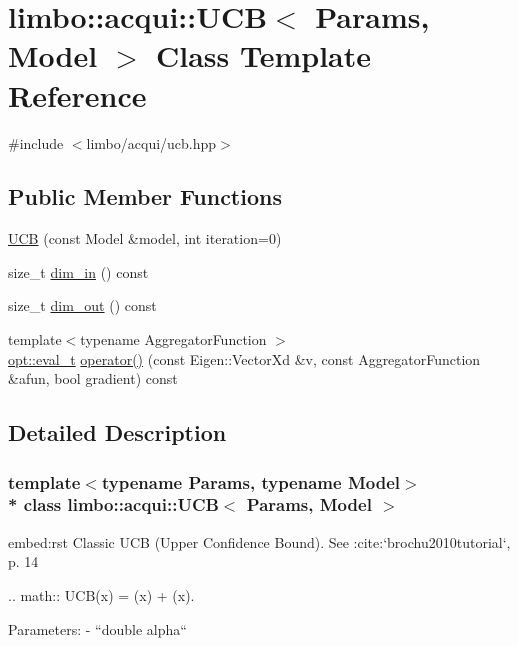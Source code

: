 \hypertarget{classlimbo_1_1acqui_1_1_u_c_b}{}\section{limbo\+:\+:acqui\+:\+:U\+CB$<$ Params, Model $>$ Class Template Reference}
\label{classlimbo_1_1acqui_1_1_u_c_b}


{\ttfamily \#include $<$limbo/acqui/ucb.\+hpp$>$}

\subsection*{Public Member Functions}
\begin{DoxyCompactItemize}
\item 
\hyperlink{classlimbo_1_1acqui_1_1_u_c_b_ae4410ba09273ea88b36130ea916fcc60}{U\+CB} (const Model \&model, int iteration=0)
\item 
size\+\_\+t \hyperlink{classlimbo_1_1acqui_1_1_u_c_b_ab922a11b709216f35db6ee83fcb86ed5}{dim\+\_\+in} () const 
\item 
size\+\_\+t \hyperlink{classlimbo_1_1acqui_1_1_u_c_b_aa6870bb7764a6f729db39f86eb005d54}{dim\+\_\+out} () const 
\item 
{\footnotesize template$<$typename Aggregator\+Function $>$ }\\\hyperlink{group__opt__tools_ga362b55973a38ac71f27a06f9d9c14f24}{opt\+::eval\+\_\+t} \hyperlink{classlimbo_1_1acqui_1_1_u_c_b_a029c5489c29e294e50e0d83a203c9572}{operator()} (const Eigen\+::\+Vector\+Xd \&v, const Aggregator\+Function \&afun, bool gradient) const 
\end{DoxyCompactItemize}


\subsection{Detailed Description}
\subsubsection*{template$<$typename Params, typename Model$>$\\*
class limbo\+::acqui\+::\+U\+C\+B$<$ Params, Model $>$}

\begin{DoxyVerb}embed:rst
Classic UCB (Upper Confidence Bound). See :cite:`brochu2010tutorial`, p. 14

  .. math::
    UCB(x) = \mu(x) + \alpha \sigma(x).

Parameters:
  - ``double alpha``
\end{DoxyVerb}
 

